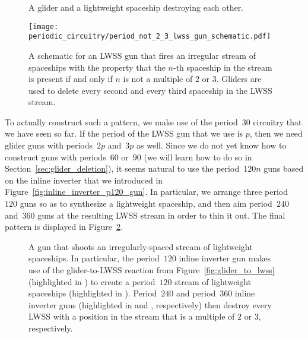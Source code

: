 \begin{figure}[!htb]
	\centering
	\begin{minipage}{0.28\textwidth}
		\centering\vspace*{0.86cm}
		\caption{A glider and a lightweight spaceship destroying each other.}\label{fig:glider_lwss_destroy}
	\end{minipage}\quad
	\begin{minipage}{0.69\textwidth}
		\centering
		\texttt{[image: periodic\_circuitry/period\_not\_2\_3\_lwss\_gun\_schematic.pdf]}
		\caption{A schematic for an LWSS gun that fires an irregular stream of spaceships with the property that the $n$-th spaceship in the stream is present if and only if $n$ is not a multiple of $2$ or $3$. Gliders are used to delete every second and every third spaceship in the LWSS stream.}
		\label{fig:period_not_2_3_lwss_gun_schematic}
	\end{minipage}
\end{figure}

To actually construct such a pattern, we make use of the period~$30$ circuitry that we have seen so far. If the period of the LWSS gun that we use is $p$, then we need glider guns with periods~$2p$ and~$3p$ as well. Since we do not yet know how to construct guns with periods~$60$ or~$90$ (we will learn how to do so in Section~\ref{sec:glider_deletion}), it seems natural to use the period~$120n$ guns based on the inline inverter that we introduced in Figure~\ref{fig:inline_inverter_p120_gun}. In particular, we arrange three period~$120$ guns so as to synthesize a lightweight spaceship, and then aim period~$240$ and~$360$ guns at the resulting LWSS stream in order to thin it out. The final pattern is displayed in Figure~\ref{fig:period_not_2_3_lwss_gun}.

\begin{figure}[!htb]
	\centering
	\caption{A gun that shoots an irregularly-spaced stream of lightweight spaceships. In particular, the period~$120$ inline inverter gun makes use of the glider-to-LWSS reaction from Figure~\ref{fig:glider_to_lwss} (highlighted in ) to create a period~$120$ stream of lightweight spaceships (highlighted in ). Period~$240$ and period~$360$ inline inverter guns (highlighted in  and , respectively) then destroy every LWSS with a position in the stream that is a multiple of $2$ or $3$, respectively.}
	\label{fig:period_not_2_3_lwss_gun}
\end{figure}



